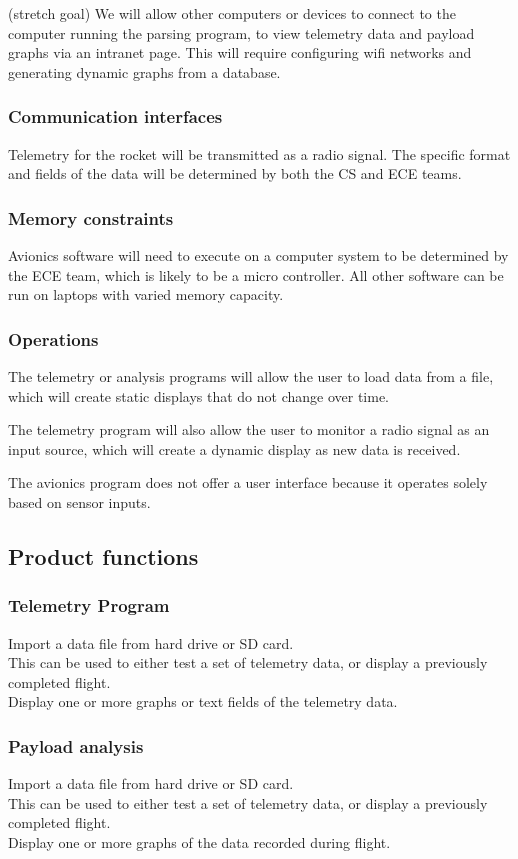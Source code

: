 \documentclass[onecolumn, draftclsnofoot, 10pt, compsoc]{IEEEtran}
\begin{document}
(stretch goal) We will allow other computers or devices to connect to the computer running the parsing program, to view telemetry data and payload graphs via an intranet page.  This will require configuring wifi networks and generating dynamic graphs from a database.

\subsubsection{Communication interfaces}
Telemetry for the rocket will be transmitted as a radio signal.  The specific format and fields of the data will be determined by both the CS and ECE teams.

\subsubsection{Memory constraints}
Avionics software will need to execute on a computer system to be determined by the ECE team, which is likely to be a micro controller. All other software can be run on laptops with varied memory capacity.

\subsubsection{Operations}
The telemetry or analysis programs will allow the user to load data from a file, which will create static displays that do not change over time.

The telemetry program will also allow the user to monitor a radio signal as an input source, which will create a dynamic display as new data is received.

The avionics program does not offer a user interface because it operates solely based on sensor inputs.

\subsection{Product functions}
\subsubsection{Telemetry Program}
Import a data file from hard drive or SD card.\\
This can be used to either test a set of telemetry data, or display a previously completed flight.\\
Display one or more graphs or text fields of the telemetry data.

\subsubsection{Payload analysis}
Import a data file from hard drive or SD card.\\
This can be used to either test a set of telemetry data, or display a previously completed flight.\\
Display one or more graphs of the data recorded during flight.
\end{document}
